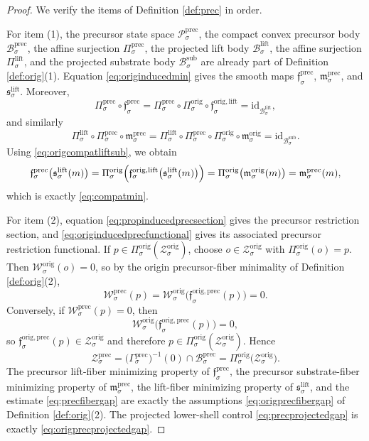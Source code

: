 \documentclass[11pt]{article}
\newcommand{\SubBody}[1]{\mathcal B_{#1}^{\mathrm{sub}}}
\newcommand{\LiftBody}[1]{\mathcal B_{#1}^{\mathrm{lift}}}
\newcommand{\LiftProj}[1]{\Pi_{#1}^{\mathrm{lift}}}
\newcommand{\LiftSelect}[1]{\mathfrak s_{#1}^{\mathrm{lift}}}
\newcommand{\PrecSpace}[1]{\mathcal P_{#1}^{\mathrm{prec}}}
\newcommand{\PrecBody}[1]{\mathcal B_{#1}^{\mathrm{prec}}}
\newcommand{\PrecProj}[1]{\Pi_{#1}^{\mathrm{prec}}}
\newcommand{\PrecLiftMin}[1]{\mathfrak f_{#1}^{\mathrm{prec}}}
\newcommand{\PrecSubMin}[1]{\mathfrak m_{#1}^{\mathrm{prec}}}
\newcommand{\PrecSection}[1]{\Gamma_{#1}^{\mathrm{prec}}}
\newcommand{\PrecFunctional}[1]{\mathscr W_{#1}^{\mathrm{prec}}}
\newcommand{\PrecShellSet}[1]{\mathcal Z_{#1}^{\mathrm{prec}}}
\newcommand{\OrigProj}[1]{\Pi_{#1}^{\mathrm{orig}}}
\newcommand{\OrigPrecMin}[1]{\mathfrak f_{#1}^{\mathrm{orig,prec}}}
\newcommand{\OrigLiftMin}[1]{\mathfrak f_{#1}^{\mathrm{orig,lift}}}
\newcommand{\OrigSubMin}[1]{\mathfrak m_{#1}^{\mathrm{orig}}}
\newcommand{\OrigFunctional}[1]{\mathscr W_{#1}^{\mathrm{orig}}}
\newcommand{\OrigShellSet}[1]{\mathcal Z_{#1}^{\mathrm{orig}}}
\begin{document}
\begin{proof}
We verify the items of Definition \ref{def:prec} in order.

For item (1), the precursor state space \(\PrecSpace{\sigma}\), the compact convex precursor body \(\PrecBody{\sigma}\), the affine surjection \(\PrecProj{\sigma}\), the projected lift body \(\LiftBody{\sigma}\), the affine surjection \(\LiftProj{\sigma}\), and the projected substrate body \(\SubBody{\sigma}\) are already part of Definition \ref{def:orig}(1). Equation \eqref{eq:originducedmin} gives the smooth maps \(\PrecLiftMin{\sigma}\), \(\PrecSubMin{\sigma}\), and \(\LiftSelect{\sigma}\). Moreover,
\[
\PrecProj{\sigma}\circ\PrecLiftMin{\sigma}
=
\PrecProj{\sigma}\circ\OrigProj{\sigma}\circ\OrigLiftMin{\sigma}
=
\mathrm{id}_{\LiftBody{\sigma}},
\]
and similarly
\[
\LiftProj{\sigma}\circ\PrecProj{\sigma}\circ\PrecSubMin{\sigma}
=
\LiftProj{\sigma}\circ\PrecProj{\sigma}\circ\OrigProj{\sigma}\circ\OrigSubMin{\sigma}
=
\mathrm{id}_{\SubBody{\sigma}}.
\]
Using \eqref{eq:origcompatliftsub}, we obtain
\[
\PrecLiftMin{\sigma}\bigl(\LiftSelect{\sigma}(m)\bigr)
=
\OrigProj{\sigma}\Bigl(
\OrigLiftMin{\sigma}\bigl(\LiftSelect{\sigma}(m)\bigr)
\Bigr)
=
\OrigProj{\sigma}\bigl(\OrigSubMin{\sigma}(m)\bigr)
=
\PrecSubMin{\sigma}(m),
\]
which is exactly \eqref{eq:compatmin}.

For item (2), equation \eqref{eq:propinducedprecsection} gives the precursor restriction section, and \eqref{eq:originducedprecfunctional} gives its associated precursor restriction functional. If \(p\in\OrigProj{\sigma}(\OrigShellSet{\sigma})\), choose \(o\in\OrigShellSet{\sigma}\) with \(\OrigProj{\sigma}(o)=p\). Then \(\OrigFunctional{\sigma}(o)=0\), so by the origin precursor-fiber minimality of Definition \ref{def:orig}(2),
\[
\PrecFunctional{\sigma}(p)
=
\OrigFunctional{\sigma}\bigl(\OrigPrecMin{\sigma}(p)\bigr)
=
0.
\]
Conversely, if \(\PrecFunctional{\sigma}(p)=0\), then
\[
\OrigFunctional{\sigma}\bigl(\OrigPrecMin{\sigma}(p)\bigr)=0,
\]
so \(\OrigPrecMin{\sigma}(p)\in\OrigShellSet{\sigma}\) and therefore \(p\in\OrigProj{\sigma}(\OrigShellSet{\sigma})\). Hence
\[
\PrecShellSet{\sigma}
=
\bigl(\PrecSection{\sigma}\bigr)^{-1}(0)\cap\PrecBody{\sigma}
=
\OrigProj{\sigma}\bigl(\OrigShellSet{\sigma}\bigr).
\]
The precursor lift-fiber minimizing property of \(\PrecLiftMin{\sigma}\), the precursor substrate-fiber minimizing property of \(\PrecSubMin{\sigma}\), the lift-fiber minimizing property of \(\LiftSelect{\sigma}\), and the estimate \eqref{eq:precfibergap} are exactly the assumptions \eqref{eq:origprecfibergap} of Definition \ref{def:orig}(2). The projected lower-shell control \eqref{eq:precprojectedgap} is exactly \eqref{eq:origprecprojectedgap}.


\end{proof}
\end{document}
